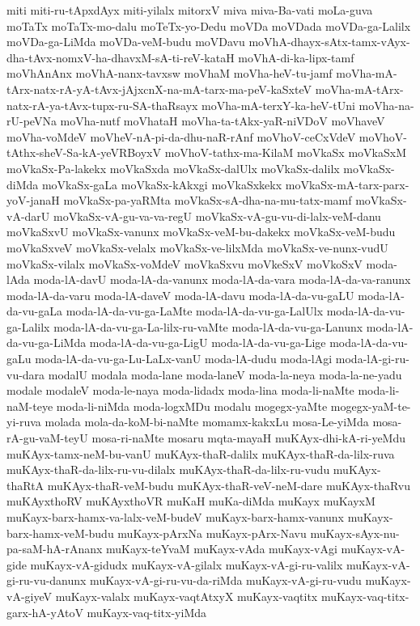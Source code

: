 {miti
miti-ru-tApxdAyx
miti-yilalx
mitorxV
miva
miva-Ba-vati
moLa-guva
moTaTx
moTaTx-mo-dalu
moTeTx-yo-Dedu
moVDa
moVDada
moVDa-ga-Lalilx
moVDa-ga-LiMda
moVDa-veM-budu
moVDavu
moVhA-dhayx-sAtx-tamx-vAyx-dha-tAvx-nomxV-ha-dhavxM-sA-ti-reV-kataH
moVhA-di-ka-lipx-tamf
moVhAnAnx
moVhA-nanx-tavxsw
moVhaM
moVha-heV-tu-jamf
moVha-mA-tArx-natx-rA-yA-tAvx-jAjxcnX-na-mA-tarx-ma-peV-kaSxteV
moVha-mA-tArx-natx-rA-ya-tAvx-tupx-ru-SA-thaRsayx
moVha-mA-terxY-ka-heV-tUni
moVha-na-rU-peVNa
moVha-nutf
moVhataH
moVha-ta-tAkx-yaR-niVDoV
moVhaveV
moVha-voMdeV
moVheV-nA-pi-da-dhu-naR-rAnf
moVhoV-ceCxVdeV
moVhoV-tAthx-sheV-Sa-kA-yeVRBoyxV
moVhoV-tathx-ma-KilaM
moVkaSx
moVkaSxM
moVkaSx-Pa-lakekx
moVkaSxda
moVkaSx-dalUlx
moVkaSx-dalilx
moVkaSx-diMda
moVkaSx-gaLa
moVkaSx-kAkxgi
moVkaSxkekx
moVkaSx-mA-tarx-parx-yoV-janaH
moVkaSx-pa-yaRMta
moVkaSx-sA-dha-na-mu-tatx-mamf
moVkaSx-vA-darU
moVkaSx-vA-gu-va-va-regU
moVkaSx-vA-gu-vu-di-lalx-veM-danu
moVkaSxvU
moVkaSx-vanunx
moVkaSx-veM-bu-dakekx
moVkaSx-veM-budu
moVkaSxveV
moVkaSx-velalx
moVkaSx-ve-lilxMda
moVkaSx-ve-nunx-vudU
moVkaSx-vilalx
moVkaSx-voMdeV
moVkaSxvu
moVkeSxV
moVkoSxV
moda-lAda
moda-lA-davU
moda-lA-da-vanunx
moda-lA-da-vara
moda-lA-da-va-ranunx
moda-lA-da-varu
moda-lA-daveV
moda-lA-davu
moda-lA-da-vu-gaLU
moda-lA-da-vu-gaLa
moda-lA-da-vu-ga-LaMte
moda-lA-da-vu-ga-LalUlx
moda-lA-da-vu-ga-Lalilx
moda-lA-da-vu-ga-La-lilx-ru-vaMte
moda-lA-da-vu-ga-Lanunx
moda-lA-da-vu-ga-LiMda
moda-lA-da-vu-ga-LigU
moda-lA-da-vu-ga-Lige
moda-lA-da-vu-gaLu
moda-lA-da-vu-ga-Lu-LaLx-vanU
moda-lA-dudu
moda-lAgi
moda-lA-gi-ru-vu-dara
modalU
modala
moda-lane
moda-laneV
moda-la-neya
moda-la-ne-yadu
modale
modaleV
moda-le-naya
moda-lidadx
moda-lina
moda-li-naMte
moda-li-naM-teye
moda-li-niMda
moda-logxMDu
modalu
mogegx-yaMte
mogegx-yaM-te-yi-ruva
molada
mola-da-koM-bi-naMte
momamx-kakxLu
mosa-Le-yiMda
mosa-rA-gu-vaM-teyU
mosa-ri-naMte
mosaru
mqta-mayaH
muKAyx-dhi-kA-ri-yeMdu
muKAyx-tamx-neM-bu-vanU
muKAyx-thaR-dalilx
muKAyx-thaR-da-lilx-ruva
muKAyx-thaR-da-lilx-ru-vu-dilalx
muKAyx-thaR-da-lilx-ru-vudu
muKAyx-thaRtA
muKAyx-thaR-veM-budu
muKAyx-thaR-veV-neM-dare
muKAyx-thaRvu
muKAyxthoRV
muKAyxthoVR
muKaH
muKa-diMda
muKayx
muKayxM
muKayx-barx-hamx-va-lalx-veM-budeV
muKayx-barx-hamx-vanunx
muKayx-barx-hamx-veM-budu
muKayx-pArxNa
muKayx-pArx-Navu
muKayx-sAyx-nu-pa-saM-hA-rAnanx
muKayx-teYvaM
muKayx-vAda
muKayx-vAgi
muKayx-vA-gide
muKayx-vA-gidudx
muKayx-vA-gilalx
muKayx-vA-gi-ru-valilx
muKayx-vA-gi-ru-vu-danunx
muKayx-vA-gi-ru-vu-da-riMda
muKayx-vA-gi-ru-vudu
muKayx-vA-giyeV
muKayx-valalx
muKayx-vaqtAtxyX
muKayx-vaqtitx
muKayx-vaq-titx-garx-hA-yAtoV
muKayx-vaq-titx-yiMda
}
